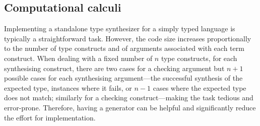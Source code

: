 \subsection{Computational calculi}\label{subsec:PCF}
Implementing a standalone type synthesizer for a simply typed language is typically a straightforward task.
However, the code size increases proportionally to the number of type constructs and of arguments associated with each term construct.
When dealing with a fixed number of $n$ type constructs, for each synthesising construct, there are two cases for a checking argument but $n + 1$ possible cases for each synthesising argument---the successful synthesis of the expected type, instances where it fails, or $n-1$ cases where the expected type does not match; similarly for a checking construct---making the task tedious and error-prone.
Therefore, having a generator can be helpful and significantly reduce the effort for implementation.

